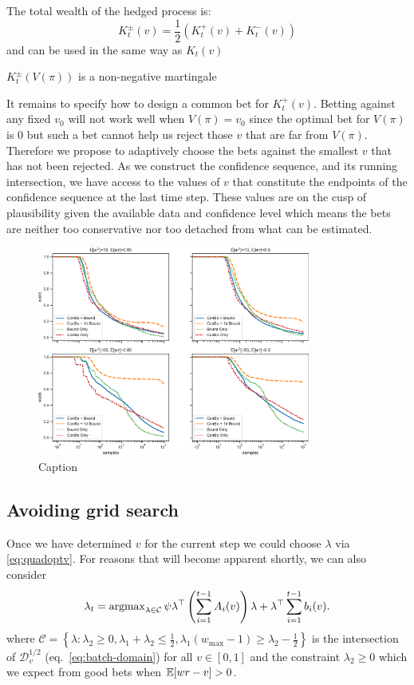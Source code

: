 The total wealth of the hedged process is:
\begin{equation}
K_t^{\pm}(v) = \frac{1}{2} (K_t^{+}(v) + K_t^{-}(v))
\label{eq:hedged}
\end{equation}
and can be used in the same way as $K_t(v)$
\begin{theorem}
$K_t^{\pm}(V(\pi))$ is a non-negative martingale
\end{theorem}

It remains to specify how to design a common bet
for $K_t^{+}(v)$.
Betting against any fixed $v_0$ 
will not work well when $V(\pi)=v_0$
since the optimal bet for $V(\pi)$ is 0 but
such a bet cannot help us reject those $v$ that are far from
$V(\pi)$. Therefore we propose to adaptively choose
the bets against the smallest $v$ 
that has not been rejected. As we 
construct the confidence sequence, and its running 
intersection, we have access to the values of $v$
that constitute the endpoints of the confidence sequence
at the last time step. These values are on the cusp of
plausibility given the available data and confidence level
which means the bets are neither too conservative nor 
too detached from what can be estimated.
\begin{figure}
    \centering
    \includegraphics[width=0.8\textwidth]{width}
    \caption{Caption}
    \label{fig:my_label}
\end{figure}

\subsection{Avoiding grid search}

Once we have determined $v$ for the current step we could 
choose $\lambda$ via \eqref{eq:quadoptv}. For reasons 
that will become apparent shortly, we can also consider
\begin{equation}
\lambda_t = \operatorname{argmax}_{\lambda \in \mathcal{C}}
\psi  \lambda^\top \left(\sum_{i=1}^{t-1} A_i(v)\right) \lambda 
+ \lambda^\top \sum_{i=1}^{t-1} b_i(v).
\label{eq:quadopt}
\end{equation}
where $\mathcal{C}=\left\{\lambda: \lambda_2\geq 0, 
\lambda_1 + \lambda_2 \leq \frac{1}{2},
\lambda_1 \left(w_{\max}-1\right) \geq \lambda_2 -\frac{1}{2}
\right\}$ is the intersection of $\mathcal{D}_{v}^{1/2}$ 
(eq.~\eqref{eq:batch-domain}) for all $v \in [0,1]$ 
and the constraint $\lambda_2\geq 0$ which we expect
from good bets when $\mathbb{E}[wr-v]>0$. 

